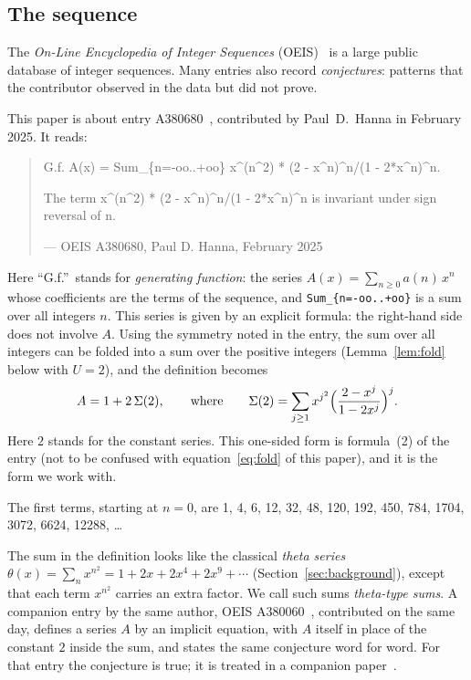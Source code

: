 \documentclass[11pt,a4paper]{article}
\theoremstyle{definition}
\theoremstyle{remark}
\begin{document}
\subsection{The sequence}\label{sec:sequence}
The \emph{On-Line Encyclopedia of Integer Sequences} (OEIS)~\cite{oeisdb} is a large public database of integer
sequences. Many
entries also record \emph{conjectures}: patterns that the contributor observed in the data but did not prove.

This paper is about entry A380680~\cite{oeis}, contributed by Paul~D.~Hanna in February 2025. It reads:
\begin{quote}\small\ttfamily\raggedright G.f. A(x) = Sum\_\{n=-oo..+oo\} x\^{}(n\^{}2) * (2 - x\^{}n)\^{}n/(1 - 2*x\^{}n)\^{}n.\par\smallskip The term x\^{}(n\^{}2) * (2 - x\^{}n)\^{}n/(1 - 2*x\^{}n)\^{}n is invariant under sign reversal of n.\par\smallskip\hfill\textrm{--- OEIS A380680, Paul D. Hanna, February 2025}\end{quote}

Here ``G.f.''\ stands for \emph{generating function}: the series $A(x)=\sum_{n\ge0}a(n)\,x^n$ whose coefficients are
the terms of the sequence, and \texttt{Sum\_\{n=-oo..+oo\}} is a sum over all integers $n$. This series is given by an explicit formula: the right-hand side does not involve $A$. Using the symmetry
noted in the entry, the sum over all integers can be folded into a sum over the positive integers
(Lemma~\ref{lem:fold} below with $U=2$), and the definition becomes
\begin{equation}\label{eq:def}
A=1+2\,\Sigma(2),\qquad\text{where}\qquad
\Sigma(2)=\sum_{j\ge1}x^{j^2}\Bigl(\frac{2-x^j}{1-2x^j}\Bigr)^{j}.
\end{equation}
Here $2$ stands for the constant series. This one-sided form is formula~(2) of the entry (not to be confused
with equation~\eqref{eq:fold} of this paper), and it is the form we work with.

The first terms, starting at $n=0$, are 1, 4, 6, 12, 32, 48, 120, 192, 450, 784, 1704, 3072, 6624, 12288, \dots{}

The sum in the definition looks like the classical \emph{theta series} $\theta(x)=\sum_nx^{n^2}=1+2x+2x^4+2x^9+\cdots$
(Section~\ref{sec:background}), except that each term $x^{n^2}$ carries an extra factor. We call such sums
\emph{theta-type sums}. A companion entry by the same author, OEIS A380060~\cite{oeisother}, contributed on
the same day, defines a series $A$ by an implicit equation, with $A$ itself in place of the constant $2$ inside the sum,
and states the same conjecture word for word. For that entry the conjecture is true; it is treated in a companion
paper~\cite{repo}.
\end{document}
